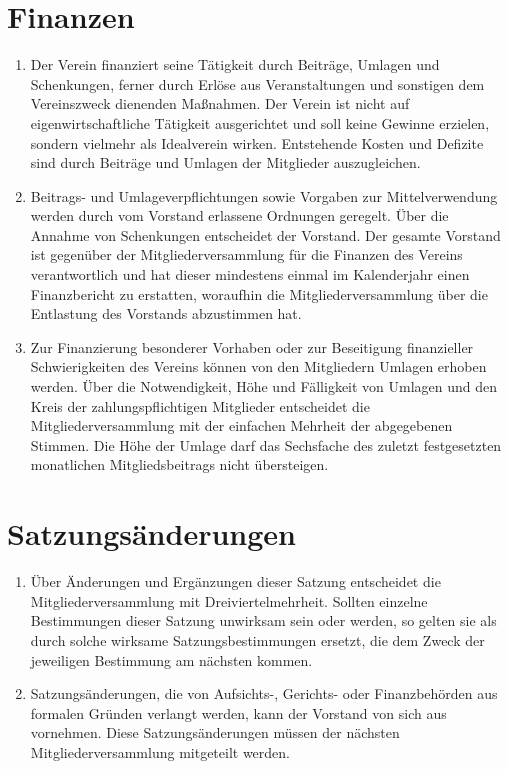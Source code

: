 \documentclass[a4paper, 10pt, headings=normal]{scrartcl}
\begin{document}
\begin{multicols}{2}
\section{Finanzen}
\label{par:finanzen}

\begin{enumerate}[label={(\arabic*)}]
	\item
		Der Verein finanziert seine Tätigkeit durch Beiträge, Umlagen und Schenkungen, ferner durch Erlöse aus Veranstaltungen und sonstigen dem Vereinszweck dienenden Maßnahmen.
		Der Verein ist nicht auf eigenwirtschaftliche Tätigkeit ausgerichtet und soll keine Gewinne erzielen, sondern vielmehr als Idealverein wirken.
		Entstehende Kosten und Defizite sind durch Beiträge und Umlagen der Mitglieder auszugleichen.
	\item
		Beitrags- und Umlageverpflichtungen sowie Vorgaben zur Mittelverwendung werden durch vom Vorstand erlassene Ordnungen geregelt.
		Über die Annahme von Schenkungen entscheidet der Vorstand.
		Der gesamte Vorstand ist gegenüber der Mitgliederversammlung für die Finanzen des Vereins verantwortlich und hat dieser mindestens einmal im Kalenderjahr einen Finanzbericht zu erstatten, woraufhin die Mitgliederversammlung über die Entlastung des Vorstands abzustimmen hat.
	\item
		Zur Finanzierung besonderer Vorhaben oder zur Beseitigung finanzieller Schwierigkeiten des Vereins können von den Mitgliedern Umlagen erhoben werden.
		Über die Notwendigkeit, Höhe und Fälligkeit von Umlagen und den Kreis der zahlungspflichtigen Mitglieder entscheidet die Mitgliederversammlung mit der einfachen Mehrheit der abgegebenen Stimmen.
		Die Höhe der Umlage darf das Sechsfache des zuletzt festgesetzten monatlichen Mitgliedsbeitrags nicht übersteigen.
\end{enumerate}

\section{Satzungsänderungen}
\label{par:satzungsaenderungen}

\begin{enumerate}[label={(\arabic*)}]
	\item
		Über Änderungen und Ergänzungen dieser Satzung entscheidet die Mitgliederversammlung mit Dreiviertelmehrheit.
		Sollten einzelne Bestimmungen dieser Satzung unwirksam sein oder werden, so gelten sie als durch solche wirksame Satzungsbestimmungen ersetzt, die dem Zweck der jeweiligen Bestimmung am nächsten kommen.
	\item
		Satzungsänderungen, die von Aufsichts\mbox{-,} Gerichts- oder Finanzbehörden aus formalen Gründen verlangt werden, kann der Vorstand von sich aus vornehmen.
		Diese Satzungsänderungen müssen der nächsten Mitgliederversammlung mitgeteilt werden.
\end{enumerate}


\end{multicols}
\end{document}

